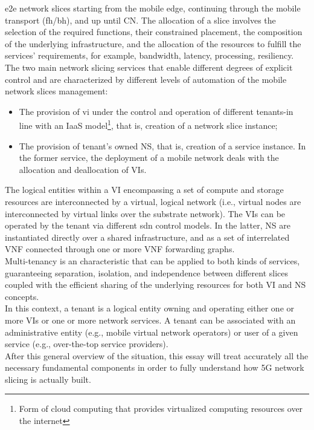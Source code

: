 \documentclass[a4paper,12pt]{report} %
\begin{document}
\gls{e2e} network slices starting from the mobile edge, continuing
through the mobile transport (\gls{fh}/\gls{bh}), and up until
\gls{CN}. The allocation of a slice involves the selection of the
required functions, their constrained placement, the composition of the underlying infrastructure, and the allocation of the resources to fulfill the services' requirements, for example, bandwidth, latency, processing, resiliency.\\
The two main network slicing services that enable different degrees
of explicit control and are characterized by different levels of automation of the
mobile network slices management:
\begin{itemize}
\item The provision of \gls{vi} under the control and operation
of different tenants-in line with an \gls{IaaS} model\footnote{Form of cloud computing that provides virtualized computing resources over the internet},
that is, creation of a network slice instance;
\end{itemize}
\begin{itemize}
\item The provision of tenant's owned \gls{NS}, that is, creation of a service instance.
In the former service, the deployment of a mobile network deals with the
allocation and deallocation of VIs.
\end{itemize}
The logical entities within a VI encompassing
a set of compute and storage resources are interconnected by a virtual, logical
network (i.e., virtual nodes are interconnected by virtual links over the substrate
network). The VIs can be operated by the tenant via different \gls{sdn} control
models. In the latter, NS are instantiated directly over a shared infrastructure,
and as a set of interrelated \gls{VNF} connected through
one or more VNF forwarding graphs.\\
Multi-tenancy is an characteristic that can be applied to both
kinds of services, guaranteeing separation, isolation, and independence between
different slices coupled with the efficient sharing of the underlying resources
for both VI and NS concepts.\\
In this context, a tenant is a logical entity owning and operating either one or more VIs or one or more network services. A tenant can be associated with an administrative entity (e.g., mobile virtual network operators) or
user of a given service (e.g., over-the-top service providers).\\
After this general overview of the situation, this essay will treat accurately all the necessary fundamental components in order to fully understand how 5G network slicing is actually built.
\end{document}
